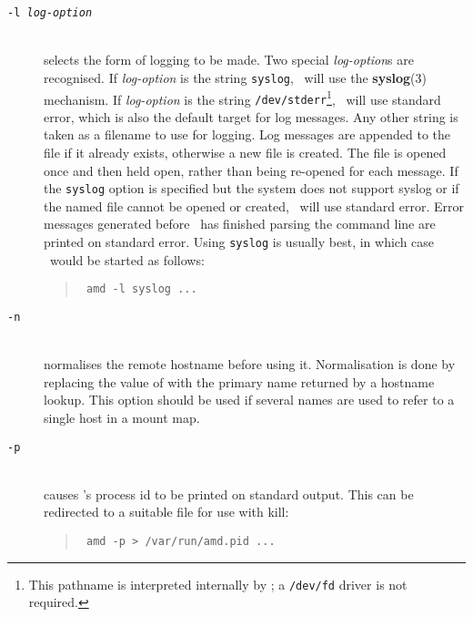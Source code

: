 \begin{description}
\item[\tt -l \em log-option]\mbox{}\\
selects the form of logging to be made.
Two special {\em log-option}s are recognised.
If {\em log-option} is the string {\tt syslog}, \amd\ will use
the {\bf syslog}(3) mechanism.
If {\em log-option} is the string {\tt /dev/stderr}\footnote{
This pathname is interpreted internally by \amd; a {\tt /dev/fd}
driver is not required.
}, \amd\ will use
standard error, which is also the default target for log messages.
Any other string is taken as a filename to
use for logging.  Log messages are appended to the file if it already
exists, otherwise a new file is created.
The file is opened once and then held open, rather than being re-opened
for each message.
If the {\tt syslog} option is specified but the system does not support syslog or
if the named file cannot be opened or created, \amd\ will use standard error.
Error messages generated before \amd\ has finished parsing the command line
are printed on standard error.
Using {\tt syslog} is usually best, in which case \amd\ would be
started as follows:
\begin{quote}
\tt
amd -l syslog ...
\end{quote}


\item[\tt -n]\mbox{}\\
normalises the remote hostname before using it.
Normalisation is done by replacing the value of  with the primary name returned by
a hostname lookup.
This option should be used if several names are used to refer to a single host in a
mount map.

\item[\tt -p]\mbox{}\\
causes \amd's process id to be printed on standard output.
This can be redirected to a suitable file for use with kill:
\begin{quote}
\tt
amd -p > /var/run/amd.pid ...
\end{quote}


\end{description}
